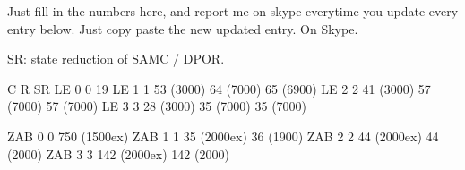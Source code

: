 

Just fill in the numbers here, and report me on skype everytime
you update every entry below.  Just copy paste the new updated entry.
On Skype.

SR: state reduction of SAMC / DPOR.

    C  R   SR
LE  0  0   19
LE  1  1   53 (3000) 64 (7000) 65 (6900)
LE  2  2   41 (3000) 57 (7000) 57 (7000)
LE  3  3   28 (3000) 35 (7000) 35 (7000)

ZAB  0  0   750 (1500ex) 
ZAB  1  1   35 (2000ex) 36 (1900)
ZAB  2  2   44 (2000ex) 44 (2000)
ZAB  3  3   142 (2000ex) 142 (2000)

\fi


